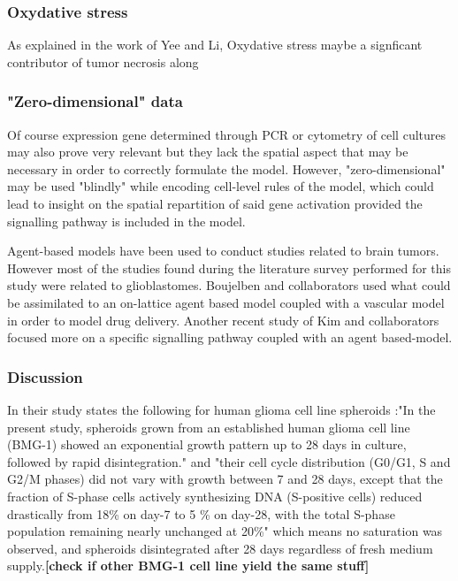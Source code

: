 \documentclass[11pt,a4paper]{article}
\begin{document}
\subsubsection{Oxydative stress} 
As explained in the work of Yee and Li, Oxydative stress maybe a signficant contributor of tumor necrosis along 


\subsubsection{"Zero-dimensional" data}
Of course expression gene determined through PCR or cytometry of cell cultures may also prove very relevant but they lack the spatial aspect that may be necessary in order to correctly formulate the model. However, "zero-dimensional" may be used "blindly" while encoding cell-level rules of the model, which could lead to insight on the spatial repartition of said gene activation provided the signalling pathway is included in the model. 

Agent-based models have been used to conduct studies related to brain tumors. However most of the studies found during the literature survey performed for this study were related to glioblastomes. Boujelben and collaborators used what could be assimilated to an on-lattice agent based model coupled with a vascular model in order to model drug delivery.\cite{Boujelben2016} Another recent study of Kim and collaborators focused more on a specific signalling pathway coupled with an agent based-model.\cite{Kim2015}



\subsubsection{Discussion}
In their study \cite{Khaitan2006} states the following for human glioma cell line spheroids :"In the present study, spheroids grown from an established human glioma cell line (BMG-1) showed an exponential growth pattern up to 28 days in culture, followed by rapid disintegration." and "their cell cycle distribution (G0/G1, S and G2/M phases) did not vary with growth between 7 and 28 days, except that the fraction of S-phase cells actively synthesizing DNA (S-positive cells) reduced drastically from 18\% on day-7 to 5 \% on day-28, with the total S-phase population remaining nearly unchanged at 20\%"\cite{Khaitan2006} which means no saturation was observed, and spheroids disintegrated after 28 days regardless of fresh medium supply.\textbf{[check if other BMG-1 cell line yield the same stuff]}
\end{document}
